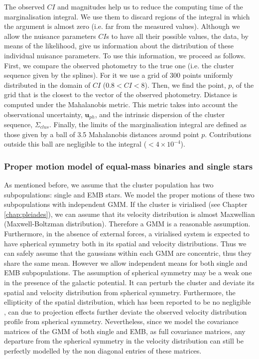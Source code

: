 The observed $CI$ and magnitudes help us  to reduce the computing time of the marginalisation integral. We use them to discard  regions of the integral in which the argument is almost zero (i.e. far from the measured values). Although we allow the nuisance parameters $CI$s to have all their possible values, the data, by means of the likelihood, give us information about the distribution of these individual nuisance parameters. To use this information, we proceed as follows. First, we compare the observed photometry to the true one (i.e. the cluster sequence given by the splines). For it we use a grid of 300 points uniformly distributed in the domain of $CI$ ($0.8<CI<8$). Then, we find the point, $p$, of the grid that is  the closest to the vector of the observed photometry.  Distance is computed under  the Mahalanobis metric. This metric takes into account the observational uncertainty, $\mathbf{u}_{ph}$, and the intrinsic dispersion of the cluster sequence, $\Sigma_{clus}$. Finally, the limits of the marginalisation integral  are defined as those given by a ball of 3.5 Mahalanobis distances around point $p$. Contributions outside this ball are negligible to the integral ($< 4\times10^{-4}$).

\subsubsection{Proper motion model of equal-mass binaries and single stars}
As mentioned before, we assume that the cluster population has two subpopulations: single and EMB stars.
We model the proper motions of these two subpopulations with independent GMM. If the cluster is virialised (see Chapter \ref{chap:pleiades}), we can assume that its velocity distribution is almost Maxwellian (Maxwell-Boltzman distribution). Therefore a GMM is a reasonable assumption. Furthermore, in the absence of external forces, a virialised system is expected to have spherical symmetry both in its spatial and velocity distributions. Thus we can safely assume that the gaussians within each GMM are concentric, thus they share the same mean. However we allow independent means for both single and EMB subpopulations. The assumption of spherical symmetry may be a weak one in the presence of the galactic potential. It can perturb the cluster and deviate its spatial and velocity distribution from spherical symmetry. Furthermore, the ellipticity of the spatial distribution, which has been reported to be no negligible \cite[$\epsilon=0.17$, according to ][]{Raboud1998}, can due to projection effects further deviate the observed velocity distribution profile from spherical symmetry. Nevertheless, since we model the covariance matrices of the GMM of both single and EMB, as full covariance matrices, any departure from the spherical symmetry in the velocity distribution can still be perfectly modelled by the non diagonal entries of these matrices.


